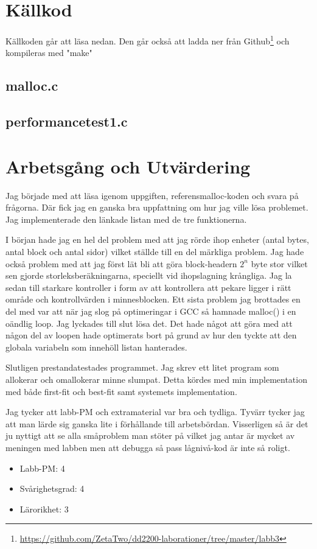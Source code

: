 \documentclass[10pt,a4paper]{article}
\begin{document}
\begin{lstlisting}

\end{lstlisting}


\clearpage
\section{Källkod}
Källkoden går att läsa nedan. Den går också att ladda ner från Github\footnote{\url{https://github.com/ZetaTwo/dd2200-laborationer/tree/master/labb3}} och kompileras med "make"

\subsection{malloc.c}

\clearpage

\subsection{performancetest1.c}

\clearpage

\section{Arbetsgång och Utvärdering}

Jag började med att läsa igenom uppgiften, referensmalloc-koden och svara på frågorna. Där fick jag en ganska bra uppfattning om hur jag ville lösa problemet. Jag implementerade den länkade listan med de tre funktionerna.

I början hade jag en hel del problem med att jag rörde ihop enheter (antal bytes, antal block och antal sidor) vilket ställde till en del märkliga problem. Jag hade också problem med att jag först lät bli att göra block-headern $2^n$ byte stor vilket sen gjorde storleksberäkningarna, speciellt vid ihopslagning krångliga. Jag la sedan till starkare kontroller i form av att kontrollera att pekare ligger i rätt område och kontrollvärden i minnesblocken. Ett sista problem jag brottades en del med var att när jag slog på optimeringar i GCC så hamnade malloc() i en oändlig loop. Jag lyckades till slut lösa det. Det hade något att göra med att någon del av loopen hade optimerats bort på grund av hur den tyckte att den globala variabeln som innehöll listan hanterades.

Slutligen prestandatestades programmet. Jag skrev ett litet program som allokerar och omallokerar minne slumpat. Detta kördes med min implementation med både first-fit och best-fit samt systemets implementation.

Jag tycker att labb-PM och extramaterial var bra och tydliga. Tyvärr tycker jag att man lärde sig ganska lite i förhållande till arbetsbördan. Visserligen så är det ju nyttigt att se alla småproblem man stöter på vilket jag antar är mycket av meningen med labben men att debugga så pass lågnivå-kod är inte så roligt.

\begin{itemize}
\item Labb-PM: 4
\item Svårighetsgrad: 4
\item Lärorikhet: 3
\end{itemize}
\end{document}
